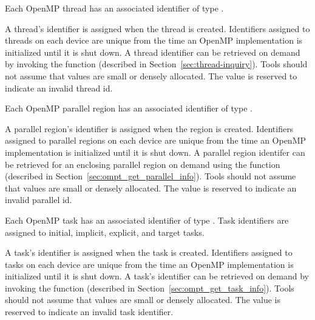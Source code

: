 
Each OpenMP thread  has an associated identifier of type .
\begin{comment}
\begin{boxedcode}
typedef unsigned long long int ompt\_thread\_id\_t;
\end{boxedcode}
\end{comment}
  A thread's identifier is assigned when the thread is created.
  Identifiers assigned to threads on each device are unique from the time an OpenMP implementation is initialized until it is shut down.
  A thread identifier can be retrieved
  on demand by invoking the  
  function (described in Section~\ref{sec:thread-inquiry}).
  Tools should not assume that  values are small or densely allocated.
  The value  is reserved to indicate an invalid thread id.

Each OpenMP parallel region has an associated identifier of type
.
\begin{comment}
\begin{boxedcode}
typedef unsigned long long int ompt\_parallel\_id\_t;
\end{boxedcode}
\end{comment}
  A parallel region's identifier is assigned
  when the region is created.  Identifiers assigned to parallel regions on each device are unique from the time an
  OpenMP implementation is initialized until it is shut down.
  A parallel region identifer can be retrieved for an enclosing parallel region
  on demand using the function   (described in Section~\ref{sec:ompt_get_parallel_info}).
  Tools should not assume that  values are small or densely allocated.
  The value  is reserved to indicate an invalid parallel id.


Each OpenMP task has an associated identifier of type
. Task identifiers are assigned to
initial, implicit, explicit, and target tasks.
\begin{comment}
\begin{boxedcode}
typedef unsigned long long int ompt\_task\_id\_t;
\end{boxedcode}
\end{comment}
  A task's identifier is assigned
  when the task is created.
  Identifiers assigned to tasks on each device are unique from the time an
  OpenMP implementation is initialized until it is shut down.
  A task's identifier can be retrieved
  on demand by invoking the   function (described in Section~\ref{sec:ompt_get_task_info}).
  Tools should not assume that  values are small or densely allocated.
  The value  is reserved to indicate an invalid task identifier.

